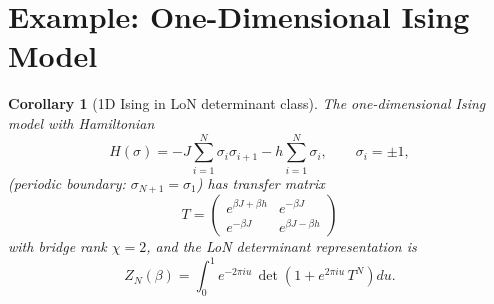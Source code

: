 \documentclass[12pt]{article}
\theoremstyle{plain}
\newtheorem{corollary}[theorem]{Corollary}
\theoremstyle{definition}
\numberwithin{equation}{section}
\begin{document}
\section{Example: One-Dimensional Ising Model}\label{sec:ising}

\begin{corollary}[1D Ising in LoN determinant class]\label{cor:ising}
The one-dimensional Ising model with Hamiltonian
\begin{equation}
H(\sigma) = -J\sum_{i=1}^N\sigma_i\sigma_{i+1}
-h\sum_{i=1}^N\sigma_i,\qquad \sigma_i=\pm1,
\end{equation}
(periodic boundary: $\sigma_{N+1}=\sigma_1$) has transfer matrix
\begin{equation}
T = \begin{pmatrix}
e^{\beta J+\beta h} & e^{-\beta J}\\
e^{-\beta J} & e^{\beta J-\beta h}
\end{pmatrix}
\end{equation}
with bridge rank $\chi=2$, and the LoN determinant representation is
\begin{equation}\label{eq:isingLoN}
\boxed{Z_N(\beta)
= \int_0^1 e^{-2\pi iu}\,
\det\!\left(1+e^{2\pi iu}\,T^N\right)du.}
\end{equation}
\end{corollary}
\end{document}
